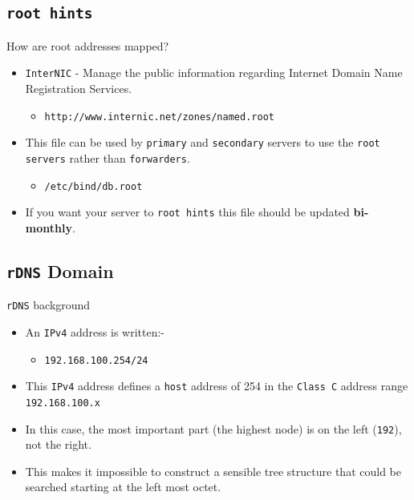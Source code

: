 \documentclass[xcolor=table,aspectratio=169]{beamer}
\begin{document}
\subsection{\texttt{root hints}}
\begin{frame}{How are root addresses mapped?}
  \begin{itemize}
    \item \texttt{InterNIC} - Manage the public information regarding Internet Domain Name Registration Services. 
      \begin{itemize}
        \item \texttt{http://www.internic.net/zones/named.root} 
      \end{itemize}
    \item This file can be used by \texttt{primary} and \texttt{secondary} servers to use the \texttt{root servers} rather than \texttt{forwarders}.
      \begin{itemize}
        \item \texttt{/etc/bind/db.root} 
      \end{itemize}
    \item If you want your server to \texttt{root hints} this file should be updated \textbf{bi-monthly}.
  \end{itemize}
\end{frame}

\subsection{\texttt{rDNS} Domain}
\begin{frame}{\texttt{rDNS} background}
  \begin{itemize}
    \item An \texttt{IPv4} address is written:-
      \begin{itemize}
        \item \texttt{192.168.100.254/24} 
      \end{itemize}
    \item This \texttt{IPv4} address defines a \texttt{host} address of 254 in the \texttt{Class C} address range \texttt{192.168.100.x}
    \item In this case, the most important part (the highest node) is on the left (\texttt{192}), not the right. 
    \item This makes it impossible to construct a sensible tree structure that could be searched starting at the left most octet.
  \end{itemize}
\end{frame}
\end{document}
